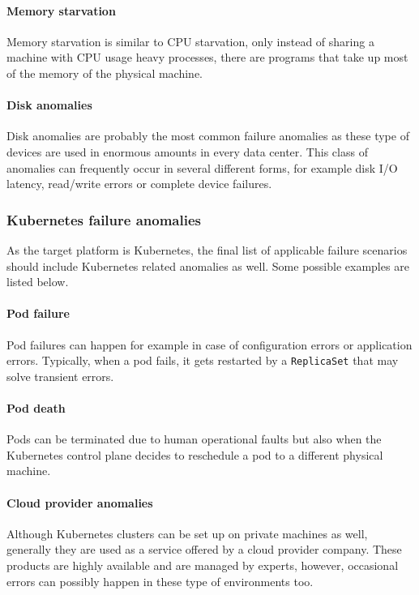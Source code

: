 \paragraph{Memory starvation} Memory starvation is similar to CPU starvation, only instead of sharing a machine with CPU usage heavy processes, there are programs that take up most of the memory of the physical machine.

\paragraph{Disk anomalies} Disk anomalies are probably the most common failure anomalies as these type of devices are used in enormous amounts in every data center. This class of anomalies can frequently occur in several different forms, for example disk I/O latency, read/write errors or complete device failures.

\subsubsection{Kubernetes failure anomalies}

As the target platform is Kubernetes, the final list of applicable failure scenarios should include Kubernetes related anomalies as well. Some possible examples are listed below.

\paragraph{Pod failure} Pod failures can happen for example in case of configuration errors or application errors. Typically, when a pod fails, it gets restarted by a \texttt{ReplicaSet} that may solve transient errors.

\paragraph{Pod death} Pods can be terminated due to human operational faults but also when the Kubernetes control plane decides to reschedule a pod to a different physical machine.

\paragraph{Cloud provider anomalies} Although Kubernetes clusters can be set up on private machines as well, generally they are used as a service offered by a cloud provider company. These products are highly available and are managed by experts, however, occasional errors can possibly happen in these type of environments too.

